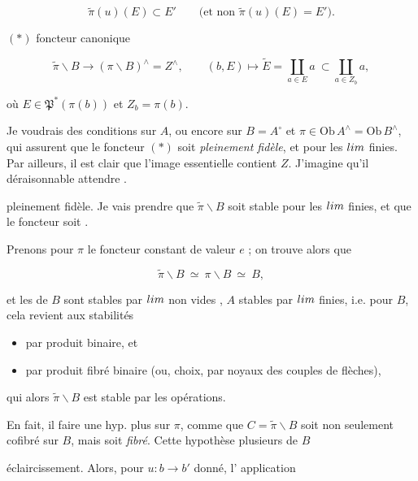 \documentclass[11pt,a4paper]{article}
\begin{document}
\[
  \widetilde{\pi}(u)(E) \subset E' \qquad \text{(et non } \widetilde{\pi}(u)(E) = E').
\]

$(*)$ foncteur canonique

\[
  \widetilde{\pi}\backslash B \longrightarrow (\pi\backslash B)^{\wedge} = Z^{\wedge},
  \qquad
  (b,E) \longmapsto \widetilde{E} = \coprod_{a \in E} a \ \subset
  \coprod_{a \in Z_{b}} a,
\]

où $E \in \mathfrak{P}^{*}(\pi(b))$ et $Z_{b} = \pi(b)$.

Je voudrais des conditions sur $A$, ou encore sur $B = A^{\circ}$ et
$\pi \in \mathrm{Ob}\,A^{\wedge} = \mathrm{Ob}\,B^{\wedge}$, qui assurent que
\struck{\ill{}} le foncteur $(*)$ soit \emph{pleinement fidèle}, \ill{} et
\ill{} pour les $\varprojlim$ finies. Par ailleurs, il est clair que \ill{}
l'image essentielle contient $Z$. J'imagine qu'il \ill{} déraisonnable
attendre \ill{}.


\ill{} pleinement fidèle. Je vais prendre  que
 $\widetilde{\pi}\backslash B$ soit stable pour les
$\varprojlim$ finies, et que le foncteur \ill{} soit \ill{}.

Prenons pour $\pi$ le foncteur constant de valeur $e$ ; on trouve alors que

\[
  \widetilde{\pi}\backslash B \ \simeq \ \pi\backslash B \ \simeq \ B,
\]

\ill{} et les \ill{} de $B$ sont stables par $\varprojlim$ \ill{} non vides
\ill{}, $A$ stables par $\varprojlim$ finies, i.e. \ill{} pour $B$, cela revient
aux stabilités

\begin{itemize}
\item[a)] par produit binaire, et
\item[b)] par produit fibré binaire (ou,  choix, \ill{} par
noyaux des couples de flèches),
\end{itemize}

qui alors $\widetilde{\pi}\backslash B$ est stable par les \ill{} opérations.

En fait, il  faire une hyp. plus \ill{} sur $\pi$, comme que
$C = \widetilde{\pi}\backslash B$ soit non seulement cofibré sur $B$, mais
\ill{} soit \emph{fibré}. Cette hypothèse \ill{} plusieurs \ill{} de $B$ \ill{}


\ill{} éclaircissement. Alors, pour $u : b \longrightarrow b'$ donné,
l' application
\end{document}
